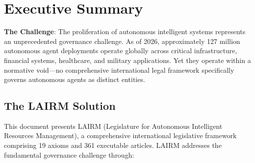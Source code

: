 \documentclass[12pt,a4paper,twoside,openright]{book}
\begin{document}


\chapter*{Executive Summary}

\begin{executivebox}
\textbf{The Challenge}: The proliferation of autonomous intelligent systems represents an unprecedented governance challenge. As of 2026, approximately 127 million autonomous agent deployments operate globally across critical infrastructure, financial systems, healthcare, and military applications. Yet they operate within a normative void—no comprehensive international legal framework specifically governs autonomous agents as distinct entities.
\end{executivebox}

\vspace{0.5cm}

\section*{The LAIRM Solution}

This document presents LAIRM (Legislature for Autonomous Intelligent Resources Management), a comprehensive international legislative framework comprising 19 axioms and 361 executable articles. LAIRM addresses the fundamental governance challenge through:
\end{document}
